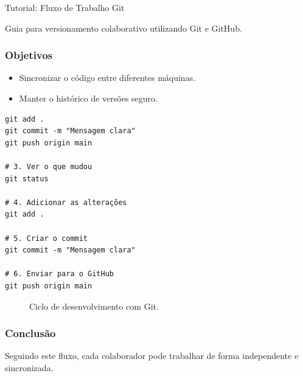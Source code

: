 \documentclass[11pt,a4paper]{article}
\begin{document}
\begin{boxTutorial}{Tutorial: Fluxo de Trabalho Git}
\label{sec:fluxo-trabalho-git}

    Guia para versionamento colaborativo utilizando Git e GitHub.
    
    \subsubsection*{Objetivos}
    \begin{itemize}
        \item Sincronizar o código entre diferentes máquinas.
        \item Manter o histórico de versões seguro.
    \end{itemize}
    
    \begin{verbatim}
git add .
git commit -m "Mensagem clara"
git push origin main

# 3. Ver o que mudou
git status

# 4. Adicionar as alterações
git add .

# 5. Criar o commit
git commit -m "Mensagem clara"

# 6. Enviar para o GitHub
git push origin main
    \end{verbatim}

    \begin{figure}[H]
        \centering
        \caption{Ciclo de desenvolvimento com Git.}
    \end{figure}

    \subsubsection*{Conclusão}
    Seguindo este fluxo, cada colaborador pode trabalhar de forma independente e sincronizada.
\end{boxTutorial}
\end{document}
